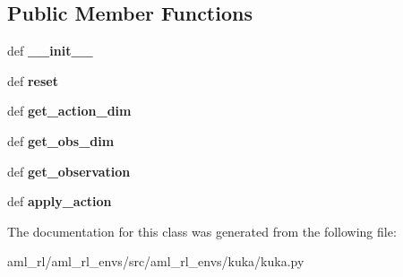 \subsection*{Public Member Functions}
\begin{DoxyCompactItemize}
\item 
\hypertarget{classaml__rl__envs_1_1kuka_1_1kuka_1_1_kuka_a2ed5ed8c576229e5a0591b91effbd6f0}{def {\bfseries \-\_\-\-\_\-init\-\_\-\-\_\-}}\label{classaml__rl__envs_1_1kuka_1_1kuka_1_1_kuka_a2ed5ed8c576229e5a0591b91effbd6f0}

\item 
\hypertarget{classaml__rl__envs_1_1kuka_1_1kuka_1_1_kuka_acf16762d494bba297650cae1526d5537}{def {\bfseries reset}}\label{classaml__rl__envs_1_1kuka_1_1kuka_1_1_kuka_acf16762d494bba297650cae1526d5537}

\item 
\hypertarget{classaml__rl__envs_1_1kuka_1_1kuka_1_1_kuka_a1510ee370e421344d30813846e9418af}{def {\bfseries get\-\_\-action\-\_\-dim}}\label{classaml__rl__envs_1_1kuka_1_1kuka_1_1_kuka_a1510ee370e421344d30813846e9418af}

\item 
\hypertarget{classaml__rl__envs_1_1kuka_1_1kuka_1_1_kuka_a5895c2486fa703c29b7d2ec6337e5df4}{def {\bfseries get\-\_\-obs\-\_\-dim}}\label{classaml__rl__envs_1_1kuka_1_1kuka_1_1_kuka_a5895c2486fa703c29b7d2ec6337e5df4}

\item 
\hypertarget{classaml__rl__envs_1_1kuka_1_1kuka_1_1_kuka_a297cf2315b396e495d1deaa5bf9b37c1}{def {\bfseries get\-\_\-observation}}\label{classaml__rl__envs_1_1kuka_1_1kuka_1_1_kuka_a297cf2315b396e495d1deaa5bf9b37c1}

\item 
\hypertarget{classaml__rl__envs_1_1kuka_1_1kuka_1_1_kuka_ac70db5f2389a090160e40406df730ae0}{def {\bfseries apply\-\_\-action}}\label{classaml__rl__envs_1_1kuka_1_1kuka_1_1_kuka_ac70db5f2389a090160e40406df730ae0}

\end{DoxyCompactItemize}


The documentation for this class was generated from the following file\-:\begin{DoxyCompactItemize}
\item 
aml\-\_\-rl/aml\-\_\-rl\-\_\-envs/src/aml\-\_\-rl\-\_\-envs/kuka/kuka.\-py\end{DoxyCompactItemize}
